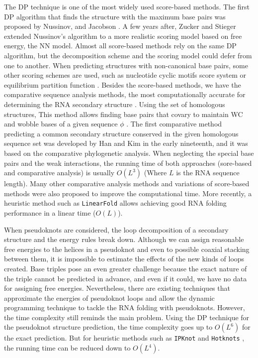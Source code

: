The DP technique is one of the most widely used score-based methods. The first DP algorithm that finds the structure with the maximum base pairs was proposed by Nussinov, and Jacobson \cite{nussinov1980fast}. A few years after, Zucker and Stieger \cite{zuker1981optimal} extended Nussinov's algorithm to a more realistic scoring model based on free energy, the NN model. Almost all score-based methods rely on the same DP algorithm, but the decomposition scheme and the scoring model could defer from one to another. When predicting structures with non-canonical base pairs, some other scoring schemes are used, such as nucleotide cyclic motifs score system \cite{zu2011folding,parisien2008mc,dallaire2016exploring} or equilibrium partition function \cite{sloma2017base}. Besides the score-based methods, we have the comparative sequence analysis methods, the most computationally accurate for determining the RNA secondary structure \cite{gutell2002accuracy, madison1966nucleotide}. Using the set of homologous structures, This method allows finding base pairs that covary to maintain WC and wobble bases of a given sequence $\phi$ \cite{gutell1985comparative}. The first comparative method predicting a common secondary structure conserved in the given homologous sequence set was developed by Han and Kim in the early nineteenth, and it was based on the comparative phylogenetic analysis. When neglecting the special base pairs and the weak interactions, the running time of both approaches (sore-based and comparative analysis) is usually $O(L^3)$ (Where $L$ is the RNA sequence length). Many other comparative analysis methods and variations of score-based methods were also proposed to improve the computational time. More recently, a heuristic method such as \texttt{LinearFold} allows achieving good RNA folding performance in a linear time ($O(L)$). 

When pseudoknots are considered, the loop decomposition of a secondary structure and the energy rules break down. Although we can assign reasonable free energies to the helices in a pseudoknot and even to possible coaxial stacking between them, it is impossible to estimate the effects of the new kinds of loops created. Base triples pose an even greater challenge because the exact nature of the triple cannot be predicted in advance, and even if it could, we have no data for assigning free energies.
Nevertheless, there are existing techniques that approximate the energies of pseudoknot loops and allow the dynamic programming technique to tackle the RNA folding with pseudoknots. However, the time complexity still reminds the main problem. Using the DP technique for the pseudoknot structure prediction, the time complexity goes up to $O(L^6)$ for the exact prediction. But for heuristic methods such as \texttt{IPKnot} \cite{sato2011ipknot} and \texttt{Hotknots} \cite{ren2005hotknots}, the running time can be reduced down to $O(L^4)$. 

